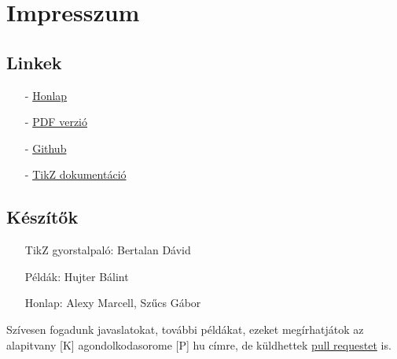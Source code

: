 \chapter{Impresszum}

\section{Linkek}
\begin{enumerate}
    \item[-] \href{./index.html}{Honlap}
    \item[-] \href{./mainpage.pdf}{PDF verzió}
    \item[-] \href{https://github.com/a-gondolkodas-orome/tikz-tutorial}{Github} 
    \item[-] \href{https://ctan.ijs.si/tex-archive/graphics/pgf/base/doc/pgfmanual.pdf}{TikZ dokumentáció} 
\end{enumerate}
        
\section{Készítők}
\begin{enumerate}
    \item[] TikZ gyorstalpaló: Bertalan Dávid
    \item[] Példák: Hujter Bálint
    \item[] Honlap: Alexy Marcell, Szűcs Gábor
\end{enumerate}

Szívesen fogadunk javaslatokat, további példákat, ezeket megírhatjátok az alapitvany [K] agondolkodasorome [P] hu címre, de küldhettek \href{https://github.com/a-gondolkodas-orome/tikz-tutorial/pulls}{pull requestet} is. 
